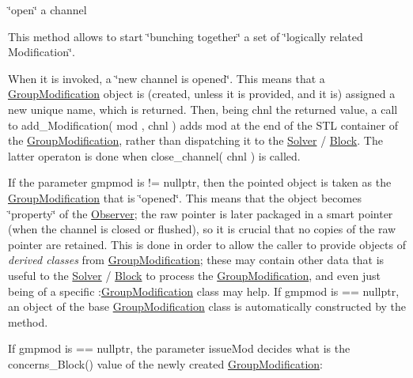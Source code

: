 \char`\"{}open\char`\"{} a channel 

This method allows to start \char`\"{}bunching together\char`\"{} a set of \char`\"{}logically
related Modification\char`\"{}.

When it is invoked, a \char`\"{}new channel is opened\char`\"{}. This means that a \mbox{\hyperlink{class_s_m_spp__di__unipi__it_1_1_group_modification}{Group\+Modification}} object is (created, unless it is provided, and it is) assigned a new unique name, which is returned. Then, being chnl the returned value, a call to add\+\_\+\+Modification( mod , chnl ) adds mod at the end of the S\+TL container of the \mbox{\hyperlink{class_s_m_spp__di__unipi__it_1_1_group_modification}{Group\+Modification}}, rather than dispatching it to the \mbox{\hyperlink{class_s_m_spp__di__unipi__it_1_1_solver}{Solver}} / \mbox{\hyperlink{class_s_m_spp__di__unipi__it_1_1_block}{Block}}. The latter operaton is done when close\+\_\+channel( chnl ) is called.

If the parameter gmpmod is != nullptr, then the pointed object is taken as the \mbox{\hyperlink{class_s_m_spp__di__unipi__it_1_1_group_modification}{Group\+Modification}} that is \char`\"{}opened\char`\"{}. This means that the object becomes \char`\"{}property\char`\"{} of the \mbox{\hyperlink{class_s_m_spp__di__unipi__it_1_1_observer}{Observer}}; the raw pointer is later packaged in a smart pointer (when the channel is closed or flushed), so it is crucial that no copies of the raw pointer are retained. This is done in order to allow the caller to provide objects of {\itshape derived classes} from \mbox{\hyperlink{class_s_m_spp__di__unipi__it_1_1_group_modification}{Group\+Modification}}; these may contain other data that is useful to the \mbox{\hyperlink{class_s_m_spp__di__unipi__it_1_1_solver}{Solver}} / \mbox{\hyperlink{class_s_m_spp__di__unipi__it_1_1_block}{Block}} to process the \mbox{\hyperlink{class_s_m_spp__di__unipi__it_1_1_group_modification}{Group\+Modification}}, and even just being of a specific \+:\mbox{\hyperlink{class_s_m_spp__di__unipi__it_1_1_group_modification}{Group\+Modification}} class may help. If gmpmod is == nullptr, an object of the base \mbox{\hyperlink{class_s_m_spp__di__unipi__it_1_1_group_modification}{Group\+Modification}} class is automatically constructed by the method.

If gmpmod is == nullptr, the parameter issue\+Mod decides what is the concerns\+\_\+\+Block() value of the newly created \mbox{\hyperlink{class_s_m_spp__di__unipi__it_1_1_group_modification}{Group\+Modification}}\+:


